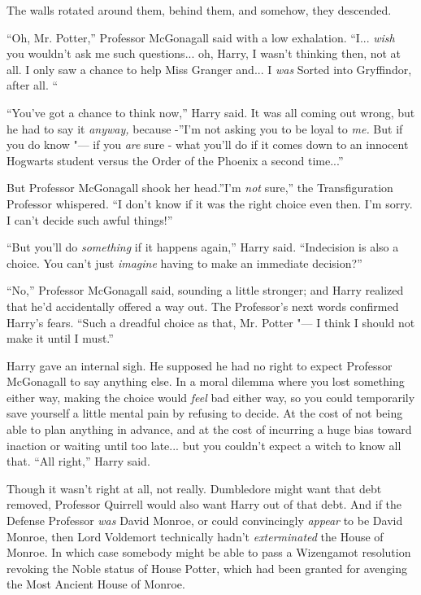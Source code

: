 The walls rotated around them, behind them, and somehow, they descended.

``Oh, Mr. Potter,'' Professor McGonagall said with a low exhalation.
``I... \emph{wish} you wouldn't ask me such questions... oh,
Harry, I wasn't thinking then, not at all. I only saw a chance to help
Miss Granger and... I \emph{was} Sorted into Gryffindor, after all.
``

``You've got a chance to think now,'' Harry said. It was all coming out
wrong, but he had to say it \emph{anyway,} because -''I'm not asking you
to be loyal to \emph{me.} But if you do know "--- if you \emph{are} sure -
what you'll do if it comes down to an innocent Hogwarts student versus
the Order of the Phoenix a second time...''

But Professor McGonagall shook her head.''I'm \emph{not} sure,'' the
Transfiguration Professor whispered. ``I don't know if it was the right
choice even then. I'm sorry. I can't decide such awful things!''

``But you'll do \emph{something} if it happens again,'' Harry said.
``Indecision is also a choice. You can't just \emph{imagine} having to
make an immediate decision?''

``No,'' Professor McGonagall said, sounding a little stronger; and Harry
realized that he'd accidentally offered a way out. The Professor's next
words confirmed Harry's fears. ``Such a dreadful choice as that, Mr.
Potter "--- I think I should not make it until I must.''

Harry gave an internal sigh. He supposed he had no right to expect
Professor McGonagall to say anything else. In a moral dilemma where you
lost something either way, making the choice would \emph{feel} bad
either way, so you could temporarily save yourself a little mental pain
by refusing to decide. At the cost of not being able to plan anything in
advance, and at the cost of incurring a huge bias toward inaction or
waiting until too late... but you couldn't expect a witch to know
all that. ``All right,'' Harry said.

Though it wasn't right at all, not really. Dumbledore might want that
debt removed, Professor Quirrell would also want Harry out of that debt.
And if the Defense Professor \emph{was} David Monroe, or could
convincingly \emph{appear} to be David Monroe, then Lord Voldemort
technically hadn't \emph{exterminated} the House of Monroe. In which
case somebody might be able to pass a Wizengamot resolution revoking the
Noble status of House Potter, which had been granted for avenging the
Most Ancient House of Monroe.

